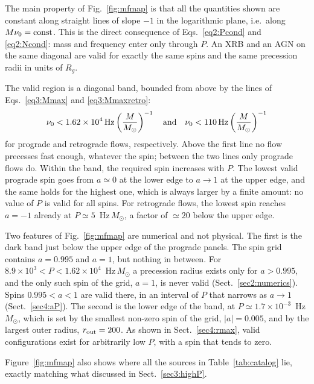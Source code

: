The main property of Fig.~\ref{fig:mfmap} is that all the quantities shown are constant along straight lines of slope $-1$ in the logarithmic plane, i.e.\ along $M\nu_0=\textup{const}$.
This is the direct consequence of Eqs.~\eqref{eq2:Pcond} and \eqref{eq2:Ncond}: mass and frequency enter only through $P$.
An XRB and an AGN on the same diagonal are valid for exactly the same spins and the same precession radii in units of $R_g$.

The valid region is a diagonal band, bounded from above by the lines of Eqs.~\eqref{eq3:Mmax} and \eqref{eq3:Mmaxretro}:
\begin{equation}
    \label{eq4:numax}
    \nu_0<1.62\times10^{4}\,\textup{Hz}\left(\frac{M}{M_\odot}\right)^{-1}
    \quad\textup{and}\quad
    \nu_0<110\,\textup{Hz}\left(\frac{M}{M_\odot}\right)^{-1}
\end{equation}
for prograde and retrograde flows, respectively.
Above the first line no flow precesses fast enough, whatever the spin; between the two lines only prograde flows do.
Within the band, the required spin increases with $P$.
The lowest valid prograde spin goes from $a\simeq0$ at the lower edge to $a\to1$ at the upper edge, and the same holds for the highest one, which is always larger by a finite amount: no value of $P$ is valid for all spins.
For retrograde flows, the lowest spin reaches $a=-1$ already at $P\simeq5$~Hz\,$M_\odot$, a factor of $\simeq20$ below the upper edge.

Two features of Fig.~\ref{fig:mfmap} are numerical and not physical.
The first is the dark band just below the upper edge of the prograde panels.
The spin grid contains $a=0.995$ and $a=1$, but nothing in between.
For $8.9\times10^3<P<1.62\times10^4$~Hz\,$M_\odot$ a precession radius exists only for $a>0.995$, and the only such spin of the grid, $a=1$, is never valid (Sect.~\ref{sec2:numerics}).
Spins $0.995<a<1$ are valid there, in an interval of $P$ that narrows as $a\to1$ (Sect.~\ref{sec4:aP}).
The second is the lower edge of the band, at $P\simeq1.7\times10^{-3}$~Hz\,$M_\odot$, which is set by the smallest non-zero spin of the grid, $|a|=0.005$, and by the largest outer radius, $r_\textup{out}=200$.
As shown in Sect.~\ref{sec4:rmax}, valid configurations exist for arbitrarily low $P$, with a spin that tends to zero.

Figure~\ref{fig:mfmap} also shows where all the sources in Table~\ref{tab:catalog} lie, exactly matching what discussed in Sect.~\ref{sec3:highP}.


